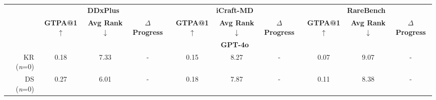 \setlength{\tabcolsep}{3.8pt}
\begin{table*}[ht]
\centering
\scriptsize
\begin{tabular}{rccccccccc}
\toprule
                               & \multicolumn{3}{c}{\textbf{DDxPlus}} & \multicolumn{3}{c}{\textbf{iCraft-MD}} & \multicolumn{3}{c}{\textbf{RareBench}} \\ \cmidrule(lr){2-4} \cmidrule(lr){5-7} \cmidrule(lr){8-10}
                               & \textbf{GTPA@1 $\uparrow$}          & \textbf{Avg Rank $\downarrow$}   & \textbf{$\Delta$ Progress} & \textbf{GTPA@1 $\uparrow$}       & \textbf{Avg Rank $\downarrow$}     & \textbf{$\Delta$ Progress}   & \textbf{GTPA@1 $\uparrow$}        & \textbf{Avg Rank $\downarrow$}   & \textbf{$\Delta$ Progress}     \\\midrule
                               & \multicolumn{9}{c}{\textbf{GPT-4o}}                                                                 \\\midrule
KR (\textit{n}=0)                &      0.18      & 7.33  &  -  &   0.15      &    8.27     & -  &       0.07   &  9.07  &    -   \\
DS (\textit{n}=0)     &  0.27    &    6.01        &       -      &      0.18          &      7.87        &          -      &       0.11       &     8.38        &           -      \\

\end{tabular}
\end{table*}
